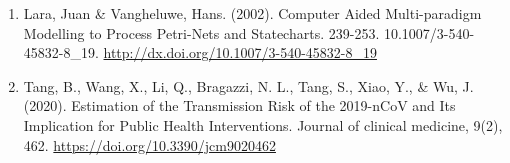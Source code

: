 \documentclass[twocolumn]{article}
\begin{document}
\begin{enumerate}

\item Lara, Juan \& Vangheluwe, Hans. (2002). Computer Aided Multi-paradigm Modelling to Process Petri-Nets and Statecharts. 239-253. 10.1007/3-540-45832-8\_19. \url{http://dx.doi.org/10.1007/3-540-45832-8_19}

\item Tang, B., Wang, X., Li, Q., Bragazzi, N. L., Tang, S., Xiao, Y., \& Wu, J. (2020).
Estimation of the Transmission Risk of the 2019-nCoV and Its Implication for
Public Health Interventions. Journal of clinical medicine, 9(2), 462.
\url{https://doi.org/10.3390/jcm9020462}



%



\end{enumerate}
\end{document}
